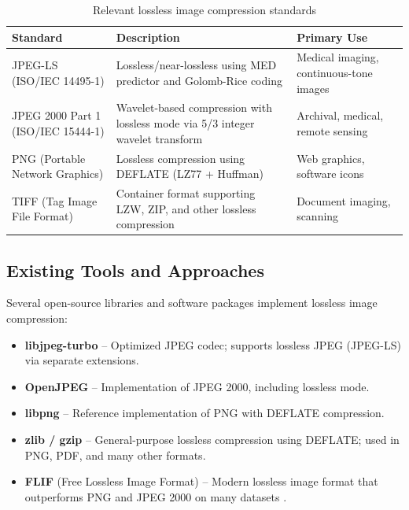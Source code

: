 \begin{table}[H]
\centering
\caption{Relevant lossless image compression standards}
\label{tab:standards}
\small
\begin{tabularx}{\textwidth}{|>{\raggedright\arraybackslash}X|>{\raggedright\arraybackslash}X|>{\raggedright\arraybackslash}X|}
\hline
\textbf{Standard} & \textbf{Description} & \textbf{Primary Use} \\
\hline
JPEG-LS (ISO/IEC 14495-1) & Lossless/near-lossless using MED predictor and Golomb-Rice coding & Medical imaging, continuous-tone images \\
\hline
JPEG 2000 Part 1 (ISO/IEC 15444-1) & Wavelet-based compression with lossless mode via 5/3 integer wavelet transform & Archival, medical, remote sensing \\
\hline
PNG (Portable Network Graphics) & Lossless compression using DEFLATE (LZ77 + Huffman) & Web graphics, software icons \\
\hline
TIFF (Tag Image File Format) & Container format supporting LZW, ZIP, and other lossless compression & Document imaging, scanning \\
\hline
\end{tabularx}
\end{table}

\subsection{Existing Tools and Approaches}

Several open-source libraries and software packages implement lossless image compression:

\begin{itemize}
    \item \textbf{libjpeg-turbo} – Optimized JPEG codec; supports lossless JPEG (JPEG-LS) via separate extensions.
    \item \textbf{OpenJPEG} – Implementation of JPEG 2000, including lossless mode.
    \item \textbf{libpng} – Reference implementation of PNG with DEFLATE compression.
    \item \textbf{zlib / gzip} – General-purpose lossless compression using DEFLATE; used in PNG, PDF, and many other formats.
    \item \textbf{FLIF} (Free Lossless Image Format) – Modern lossless image format that outperforms PNG and JPEG 2000 on many datasets \cite{Salomon1997}.
\end{itemize}


